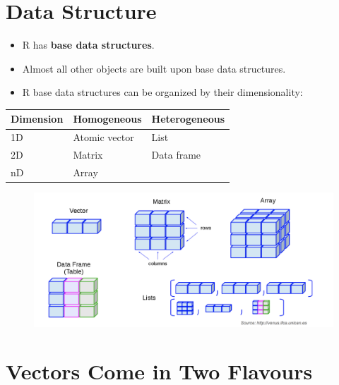 \documentclass[]{book}
\providecommand{\tightlist}{%
  \setlength{\itemsep}{0pt}\setlength{\parskip}{0pt}}
\begin{document}
\section{Data Structure}\label{data-structure}

\begin{itemize}
\tightlist
\item
  R has \textbf{base data structures}.
\item
  Almost all other objects are built upon base data structures.
\item
  R base data structures can be organized by their dimensionality:
\end{itemize}

\begin{longtable}[]{@{}lll@{}}
\toprule
Dimension & Homogeneous & Heterogeneous\tabularnewline
\midrule
\endhead
1D & Atomic vector & List\tabularnewline
2D & Matrix & Data frame\tabularnewline
nD & Array &\tabularnewline
\bottomrule
\end{longtable}

\begin{figure}[htbp]
\centering
\includegraphics{datastructure.png}
\caption{}
\end{figure}

\section{Vectors Come in Two
Flavours}\label{vectors-come-in-two-flavours}
\end{document}
